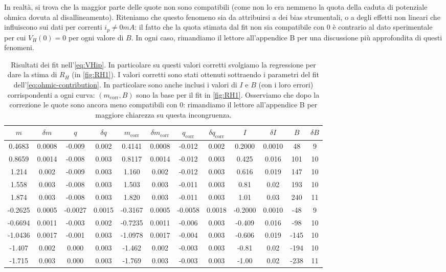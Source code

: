 In realtà, si trova che la maggior parte delle quote non sono compatibili (come non lo era nemmeno la quota della caduta di potenziale ohmica dovuta al disallineamento).
Riteniamo che questo fenomeno sia da attribuirsi a dei bias strumentali, o a degli effetti non lineari che influiscono sui dati per correnti $ i_p \neq 0 \unit{mA} $: il fatto che la quota stimata dal fit non sia compatibile con $ 0 $ è contrario al dato sperimentale per cui $ V_H(0) = 0 $ per ogni valore di $ B $.
In ogni caso, rimandiamo il lettore all'appendice B per una discussione più approfondita di questi fenomeni.

\begin{table}
\centering \footnotesize
\begin{tabular}{cccc|cccc|cccc}
$m$ & $\delta m$ & $q$ & $\delta q$ & $m_\text{corr}$ & $\delta m_\text{corr}$ & $q_\text{corr}$ & $\delta q_\text{corr}$ & $I$ & $\delta I$ & $B$ & $\delta B$ \\
\hline
0.4683 & 0.0008 & -0.009 & 0.002 & 0.4141 & 0.0008 & -0.012 & 0.002 & 0.2000 & 0.0010 & 48 & 9\\
0.8659 & 0.0014 & -0.008 & 0.003 & 0.8117 & 0.0014 & -0.012 & 0.003 & 0.425 & 0.016 & 101 & 10\\
1.214 & 0.002 & -0.009 & 0.003 & 1.160 & 0.002 & -0.012 & 0.003 & 0.616 & 0.019 & 147 & 10\\
1.558 & 0.003 & -0.008 & 0.003 & 1.503 & 0.003 & -0.011 & 0.003 & 0.81 & 0.02 & 193 & 10\\
1.874 & 0.003 & -0.008 & 0.003 & 1.820 & 0.003 & -0.011 & 0.003 & 1.01 & 0.03 & 240 & 11\\
-0.2625 & 0.0005 & -0.0027 & 0.0015 & -0.3167 & 0.0005 & -0.0058 & 0.0018 & -0.2000 & 0.0010 & -48 & 9\\
-0.6694 & 0.0011 & -0.003 & 0.002 & -0.7235 & 0.0011 & -0.006 & 0.003 & -0.409 & 0.016 & -98 & 10\\
-1.0436 & 0.0017 & -0.001 & 0.003 & -1.0978 & 0.0017 & -0.004 & 0.003 & -0.606 & 0.019 & -145 & 10\\
-1.407 & 0.002 & 0.000 & 0.003 & -1.462 & 0.002 & -0.003 & 0.003 & -0.81 & 0.02 & -194 & 10\\
-1.715 & 0.003 & 0.000 & 0.003 & -1.769 & 0.003 & -0.003 & 0.003 & -1.00 & 0.02 & -238 & 11\\
\end{tabular}
\caption{Risultati dei fit nell'\cref{eq:VHip}. In particolare su questi valori corretti svolgiamo la regressione per dare la stima di $ R_H $ (in \cref{fig:RH1}). I valori corretti sono stati ottenuti sottraendo i parametri del fit dell'\cref{eq:ohmic-contribution}. In particolare sono anche inclusi i valori di $ I $ e $ B $ (con i loro errori) corrispondenti a ogni curva: $ (m_\text{corr}, B) $ sono la base per il fit in \cref{fig:RH1}. Osserviamo che dopo la correzione le quote sono ancora meno compatibili con $ 0 $: rimandiamo il lettore all'appendice B per maggiore chiarezza su questa incongruenza.}
\label{tab:slope-VHi}
\end{table}

